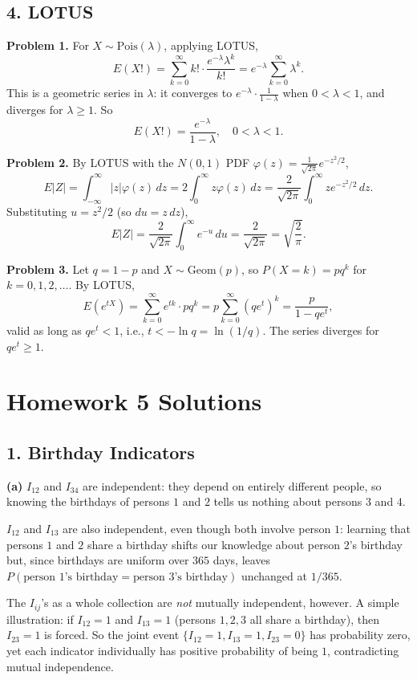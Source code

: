 \documentclass{article}
\begin{document}
\subsection*{4. LOTUS}

\textbf{Problem 1.} For $X\sim\text{Pois}(\lambda)$, applying LOTUS,
$$
E(X!) = \sum_{k=0}^{\infty} k!\cdot\frac{e^{-\lambda}\lambda^k}{k!} = e^{-\lambda}\sum_{k=0}^{\infty}\lambda^k.
$$
This is a geometric series in $\lambda$: it converges to $e^{-\lambda}\cdot\frac{1}{1-\lambda}$ when $0<\lambda<1$, and diverges for $\lambda\ge1$. So
$$
E(X!) = \frac{e^{-\lambda}}{1-\lambda}, \quad 0<\lambda<1.
$$

\bigskip
\textbf{Problem 2.} By LOTUS with the $N(0,1)$ PDF $\varphi(z)=\frac{1}{\sqrt{2\pi}}e^{-z^2/2}$,
$$
E|Z| = \int_{-\infty}^{\infty}|z|\varphi(z)\,dz = 2\int_0^{\infty}z\varphi(z)\,dz = \frac{2}{\sqrt{2\pi}}\int_0^{\infty}ze^{-z^2/2}\,dz.
$$
Substituting $u=z^2/2$ (so $du=z\,dz$),
$$
E|Z| = \frac{2}{\sqrt{2\pi}}\int_0^{\infty}e^{-u}\,du = \frac{2}{\sqrt{2\pi}} = \sqrt{\frac{2}{\pi}}.
$$

\bigskip
\textbf{Problem 3.} Let $q=1-p$ and $X\sim\text{Geom}(p)$, so $P(X=k)=pq^k$ for $k=0,1,2,\dots$. By LOTUS,
$$
E(e^{tX}) = \sum_{k=0}^{\infty}e^{tk}\cdot pq^k = p\sum_{k=0}^{\infty}(qe^t)^k = \frac{p}{1-qe^t},
$$
valid as long as $qe^t<1$, i.e., $t<-\ln q = \ln(1/q)$. The series diverges for $qe^t\ge1$.

\bigskip
\section*{Homework 5 Solutions}

\subsection*{1. Birthday Indicators}

\textbf{(a)} $I_{12}$ and $I_{34}$ are independent: they depend on entirely different people, so knowing the birthdays of persons $1$ and $2$ tells us nothing about persons $3$ and $4$.

$I_{12}$ and $I_{13}$ are also independent, even though both involve person $1$: learning that persons $1$ and $2$ share a birthday shifts our knowledge about person $2$'s birthday but, since birthdays are uniform over $365$ days, leaves $P(\text{person 1's birthday} = \text{person 3's birthday})$ unchanged at $1/365$.

The $I_{ij}$'s as a whole collection are \emph{not} mutually independent, however. A simple illustration: if $I_{12}=1$ and $I_{13}=1$ (persons $1,2,3$ all share a birthday), then $I_{23}=1$ is forced. So the joint event $\{I_{12}=1, I_{13}=1, I_{23}=0\}$ has probability zero, yet each indicator individually has positive probability of being $1$, contradicting mutual independence.
\end{document}
